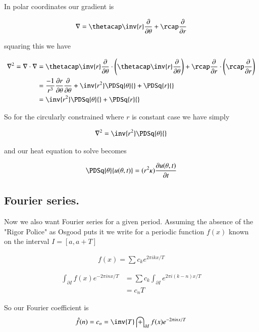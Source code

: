 In polar coordinates our gradient is

\begin{align*}
\grad = \thetacap \inv{r} \PD{\theta}{} +\rcap \PD{r}{} 
\end{align*}

squaring this we have

\begin{align*}
\grad^2 = \grad \cdot \grad
&= 
\thetacap \inv{r} \PD{\theta}{} \cdot \left(\thetacap \inv{r} \PD{\theta}{}\right)
 +
\rcap \PD{r}{} \cdot \left(\rcap \PD{r}{} \right) \\
&= 
\frac{-1}{r^3} \PD{\theta}{r} \PD{\theta}{}
+\inv{r^2} \PDSq{\theta}{}
+ \PDSq{r}{}
\\
&= \inv{r^2} \PDSq{\theta}{} + \PDSq{r}{} \\
\end{align*}

So for the circularly constrained where $r$ is constant case we have simply

\begin{align}
\grad^2 = \inv{r^2} \PDSq{\theta}{}
\end{align}

and our heat equation to solve becomes

\begin{align}
\PDSq{\theta}{u(\theta, t)} = (r^2 \kappa) \PD{t}{u(\theta, t)}
\end{align}

\subsection{Fourier series. }

Now we also want Fourier series for a given period.  Assuming the absence of the "Rigor Police" as Osgood puts it
we write for a periodic function $f(x)$ known on the interval $I = [a, a+T]$

\begin{align*}
f(x) = \sum c_k e^{2\pi i k x/T}
\end{align*}

\begin{align*}
\int_{\partial I} f(x) e^{- 2 \pi i n x /T} 
&= \sum c_k \int_{\partial I} e^{2\pi i (k -n) x/T} \\
&= c_n T
\end{align*}

So our Fourier coefficient is
\begin{align*}
\hat{f}(n) = c_n = \inv{T} \int_{\partial I} f(x) e^{- 2 \pi i n x /T} 
\end{align*}

